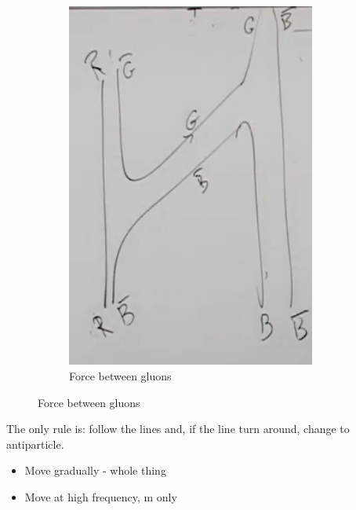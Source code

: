 \documentclass[]{article}
\begin{document}
\begin{figure}[H]
\begin{subfigure}{0.45\textwidth}
	\end{subfigure}
		\begin{subfigure}{0.45\textwidth}
		\caption{Force between gluons}
		\includegraphics[width=0.9\textwidth]{2-2-gluon8}
	\end{subfigure}
\end{figure}

The only rule is: follow the lines and, if the line turn around, change to antiparticle.

\begin{itemize}
	\item Move gradually - whole thing
	\item Move at high frequency, m only
\end{itemize}
\end{document}
